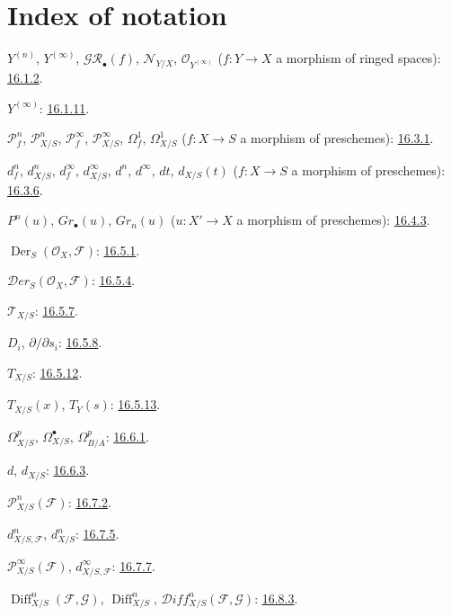 \clearpage
{}
{}
\section*{Index of notation}

\begingroup
\small
\setlength{\parindent}{0pt}
\setlength{\parskip}{2pt}
\newcommand{\EGAIVidxref}[1]{\hyperref[IV.#1]{#1}}

$Y^{(n)}$, $Y^{(\infty)}$, $\mathcal{GR}_{\bullet}(f)$,
$\mathcal{N}_{Y/X}$, $\mathcal{O}_{Y^{(\infty)}}$
($f:Y\to X$ a morphism of ringed spaces): \EGAIVidxref{16.1.2}.

$Y^{(\infty)}$: \EGAIVidxref{16.1.11}.

$\mathcal{P}^{n}_{f}$, $\mathcal{P}^{n}_{X/S}$,
$\mathcal{P}^{\infty}_{f}$, $\mathcal{P}^{\infty}_{X/S}$,
$\Omega^{1}_{f}$, $\Omega^{1}_{X/S}$
($f:X\to S$ a morphism of preschemes): \EGAIVidxref{16.3.1}.

$d^{n}_{f}$, $d^{n}_{X/S}$, $d^{\infty}_{f}$,
$d^{\infty}_{X/S}$, $d^{n}$, $d^{\infty}$, $dt$, $d_{X/S}(t)$
($f:X\to S$ a morphism of preschemes): \EGAIVidxref{16.3.6}.

$P^{n}(u)$, $Gr_{\bullet}(u)$, $Gr_{n}(u)$
($u:X'\to X$ a morphism of preschemes): \EGAIVidxref{16.4.3}.

$\operatorname{Der}_{S}(\mathcal{O}_{X},\mathcal{F})$:
\EGAIVidxref{16.5.1}.

$\mathcal{D}er_{S}(\mathcal{O}_{X},\mathcal{F})$:
\EGAIVidxref{16.5.4}.

$\mathcal{T}_{X/S}$: \EGAIVidxref{16.5.7}.

$D_i$, $\partial/\partial s_i$: \EGAIVidxref{16.5.8}.

$T_{X/S}$: \EGAIVidxref{16.5.12}.

$T_{X/S}(x)$, $T_Y(s)$: \EGAIVidxref{16.5.13}.

$\Omega^p_{X/S}$, $\Omega^\bullet_{X/S}$, $\Omega^p_{B/A}$:
\EGAIVidxref{16.6.1}.

$d$, $d_{X/S}$: \EGAIVidxref{16.6.3}.

$\mathcal{P}^n_{X/S}(\mathcal{F})$: \EGAIVidxref{16.7.2}.

$d^n_{X/S,\mathcal{F}}$, $d^n_{X/S}$: \EGAIVidxref{16.7.5}.

$\mathcal{P}^{\infty}_{X/S}(\mathcal{F})$,
$d^{\infty}_{X/S,\mathcal{F}}$: \EGAIVidxref{16.7.7}.

$\operatorname{Diff}^{n}_{X/S}(\mathcal{F},\mathcal{G})$,
$\operatorname{Diff}^{n}_{X/S}$,
$\mathcal{D}iff^{n}_{X/S}(\mathcal{F},\mathcal{G})$:
\EGAIVidxref{16.8.3}.

